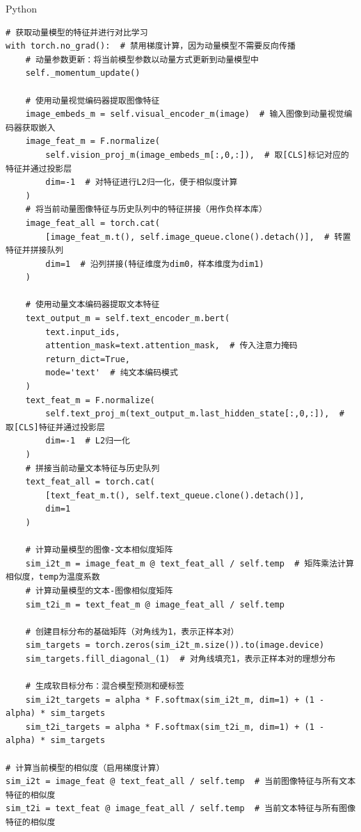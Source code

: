 \documentclass[zihao=false,fontset=windows]{ctexart}
\begin{document}
\begin{feishucode}
{\small\ttfamily\color{feishuGray}Python}\par\vspace{-0.15em}
\begin{lstlisting}
# 获取动量模型的特征并进行对比学习
with torch.no_grad():  # 禁用梯度计算，因为动量模型不需要反向传播
    # 动量参数更新：将当前模型参数以动量方式更新到动量模型中
    self._momentum_update()
    
    # 使用动量视觉编码器提取图像特征
    image_embeds_m = self.visual_encoder_m(image)  # 输入图像到动量视觉编码器获取嵌入
    image_feat_m = F.normalize(
        self.vision_proj_m(image_embeds_m[:,0,:]),  # 取[CLS]标记对应的特征并通过投影层
        dim=-1  # 对特征进行L2归一化，便于相似度计算
    )  
    # 将当前动量图像特征与历史队列中的特征拼接（用作负样本库）
    image_feat_all = torch.cat(
        [image_feat_m.t(), self.image_queue.clone().detach()],  # 转置特征并拼接队列
        dim=1  # 沿列拼接(特征维度为dim0，样本维度为dim1)
    )                                         
    
    # 使用动量文本编码器提取文本特征
    text_output_m = self.text_encoder_m.bert(
        text.input_ids, 
        attention_mask=text.attention_mask,  # 传入注意力掩码
        return_dict=True, 
        mode='text'  # 纯文本编码模式
    )    
    text_feat_m = F.normalize(
        self.text_proj_m(text_output_m.last_hidden_state[:,0,:]),  # 取[CLS]特征并通过投影层
        dim=-1  # L2归一化
    ) 
    # 拼接当前动量文本特征与历史队列
    text_feat_all = torch.cat(
        [text_feat_m.t(), self.text_queue.clone().detach()],
        dim=1
    )

    # 计算动量模型的图像-文本相似度矩阵
    sim_i2t_m = image_feat_m @ text_feat_all / self.temp  # 矩阵乘法计算相似度，temp为温度系数
    # 计算动量模型的文本-图像相似度矩阵
    sim_t2i_m = text_feat_m @ image_feat_all / self.temp     
    
    # 创建目标分布的基础矩阵（对角线为1，表示正样本对）
    sim_targets = torch.zeros(sim_i2t_m.size()).to(image.device)
    sim_targets.fill_diagonal_(1)  # 对角线填充1，表示正样本对的理想分布
    
    # 生成软目标分布：混合模型预测和硬标签
    sim_i2t_targets = alpha * F.softmax(sim_i2t_m, dim=1) + (1 - alpha) * sim_targets
    sim_t2i_targets = alpha * F.softmax(sim_t2i_m, dim=1) + (1 - alpha) * sim_targets        

# 计算当前模型的相似度（启用梯度计算）
sim_i2t = image_feat @ text_feat_all / self.temp  # 当前图像特征与所有文本特征的相似度
sim_t2i = text_feat @ image_feat_all / self.temp  # 当前文本特征与所有图像特征的相似度
             

\end{lstlisting}
\end{feishucode}
\end{document}
